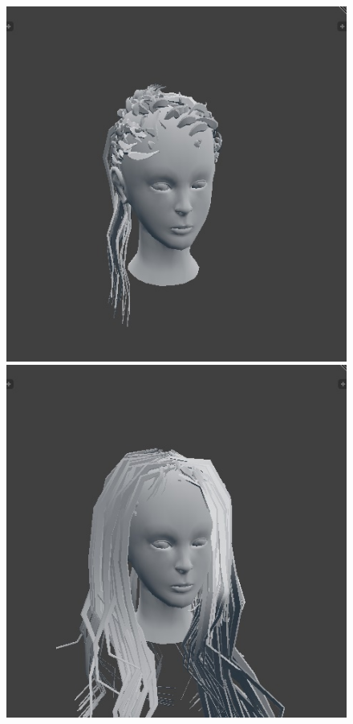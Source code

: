 \documentclass[ %
author={Dillon Keith Diep},
supervisor={Dr. Carl Henrik Ek},
degree={MEng},
title={ART-CG Hair:},
subtitle={Assisted Real-time Content Generation of Stylised Virtual Hair},
type={Research},
year={2017} ]{dissertation}
\begin{document}
\begin{figure}[!h]
	\includegraphics[scale=0.25]{images/outputMesh9}
	\includegraphics[scale=0.25]{images/outputMesh10}

\end{figure}
\end{document}
